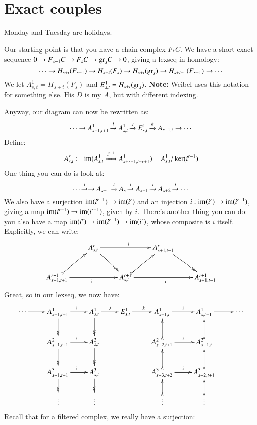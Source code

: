\section{Exact couples}
Monday and Tuesday are holidays.

Our starting point is that you have a chain complex $F_\ast C$.
We have a short exact sequence $0\to F_{s-1} C\to F_s C \to \mathrm{gr}_s C \to 0$, giving a lexseq in homology:
$$
\cdots\to H_{s+t}(F_{s-1}) \to H_{s+t}(F_s) \to H_{s+t}(\mathrm{gr}_s) \to H_{s+t-1}(F_{s-1}) \to \cdots
$$
We let $A^1_{s,t} = H_{s+t}(F_{s})$ and $E^1_{s,t} = H_{s+t}(\mathrm{gr}_s)$.
\textbf{Note: }Weibel uses this notation for something else.
His $D$ is my $A$, but with different indexing.

Anyway, our diagram can now be rewritten as:
$$
\cdots\to A^1_{s-1,t+1} \xrightarrow{{i}} A^1_{s,t} \xrightarrow{{j}} E^1_{s,t} \xrightarrow{{k}} A_{s-1, t} \to \cdots
$$
Define:
$$
A^r_{s,t} := \operatorname{im}(A^1_{s,t} \xrightarrow{{i^{r-1}}} A^1_{s+r - 1, t-r + 1}) = A^1_{s,t}/\ker(i^{r-1})
$$
One thing you can do is look at:
$$
\cdots \xrightarrow{{i}} \to A_{s-1} \xrightarrow{{i}} A_s \xrightarrow{{i}} A_{s+1} \xrightarrow{{i}} A_{s+2} \xrightarrow{{i}} \cdots
$$
We also have a surjection $\operatorname{im}(i^{r-1}) \to \operatorname{im}(i^r)$ and an injection $i:\operatorname{im}(i^r) \to \operatorname{im}(i^{r-1})$, giving a map $\operatorname{im}(i^{r-1}) \to \operatorname{im}(i^{r-1})$, given by $i$.
There's another thing you can do: you also have a map $\operatorname{im}(i^r) \to \operatorname{im}(i^{r-1}) \to \operatorname{im}(i^r)$, whose composite is $i$ itself.
Explicitly, we can write:
\begin{equation*}
    \xymatrix{
	& A^r_{s,t} \ar@{->>}[dr]\ar[rr]^i & & A^r_{s+1,t-1}\ar@{->>}[dr] & \\
	A^{r+1}_{s-1,t+1}\ar@{>->}[ur]\ar[rr]_i & & A^{r+1}_{s,t}\ar@{>->}[ur]\ar[rr]_i & & A^{r+1}_{s+1,t-1}
    }
\end{equation*}
Great, so in our lexseq, we now have:
\begin{equation*}
    \xymatrix{
	\cdots\ar[r] & A^1_{s-1,t+1}\ar@{->>}[d] \ar[r]^i & A^1_{s,t} \ar@{->>}[d] \ar[r]^j & E^1_{s,t} \ar[r]^k & A^1_{s-1,t}\ar[r]^i & A^1_{s,t-1} \ar[r] & \cdots\\
	& A^2_{s-1,t+1}\ar@{->>}[d]\ar[r]^i & A^2_{s,t}\ar@{->>}[d] & & A^2_{s-2,t+1}\ar[r]^i \ar@{>->}[u] & A^2_{s-1,t}\ar@{>->}[u] & \\
	& A^3_{s-1,t+1}\ar[r]^i\ar@{->>}[d] & A^3_{s,t}\ar@{->>}[d] & & A^3_{s-3,t+2}\ar@{>->}[u]\ar[r]^i & A^3_{s-2,t+1}\ar@{>->}[u] &\\
	& \vdots & \vdots & & \vdots \ar@{>->}[u] & \vdots\ar@{>->}[u] &
    }
\end{equation*}
Recall that for a filtered complex, we really have a surjection:

